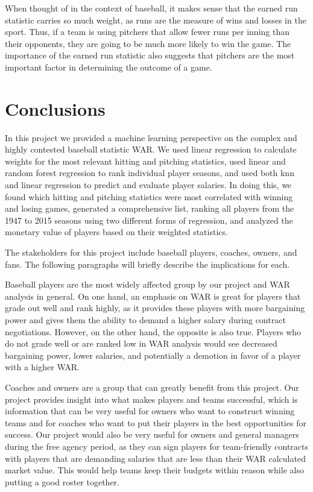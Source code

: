 \documentclass{article}
\begin{document}
    When thought of in the context of baseball, it makes sense that the earned run statistic carries so much weight, as runs are the measure of wins and losses in the sport. Thus, if a team is using pitchers that allow fewer runs per inning than their opponents, they are going to be much more likely to win the game. The importance of the earned run statistic also suggests that pitchers are the most important factor in determining the outcome of a game. 


\section{Conclusions}
\label{conclusion}

In this project we provided a machine learning perspective on the complex and highly contested baseball statistic WAR. We used linear regression to calculate weights for the most relevant hitting and pitching statistics, used linear and random forest regression to rank individual player seasons, and used both knn and linear regression to predict and evaluate player salaries. In doing this, we found which hitting and pitching statistics were most correlated with winning and losing games, generated a comprehensive list, ranking all players from the 1947 to 2015 seasons using two different forms of regression, and analyzed the monetary value of players based on their weighted statistics.

The stakeholders for this project include baseball players, coaches, owners, and fans. The following paragraphs will briefly describe the implications for each.

Baseball players are the most widely affected group by our project and WAR analysis in general. On one hand, an emphasis on WAR is great for players that grade out well and rank highly, as it provides these players with more bargaining power and gives them the ability to demand a higher salary during contract negotiations. However, on the other hand, the opposite is also true. Players who do not grade well or are ranked low in WAR analysis would see decreased bargaining power, lower salaries, and potentially a demotion in favor of a player with a higher WAR.

Coaches and owners are a group that can greatly benefit from this project. Our project provides insight into what makes players and teams successful, which is information that can be very useful for owners who want to construct winning teams and for coaches who want to put their players in the best opportunities for success. Our project would also be very useful for owners and general managers during the free agency period, as they can sign players for team-friendly contracts with players that are demanding salaries that are less than their WAR calculated market value. This would help teams keep their budgets within reason while also putting a good roster together.
\end{document}
